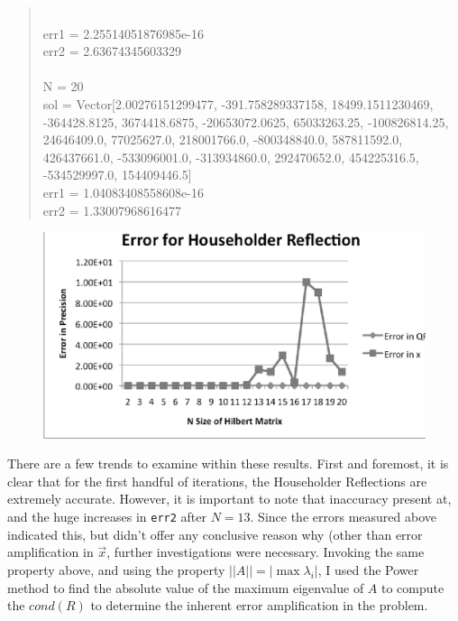\documentclass[letterpaper,12pt]{article}
\begin{document}
\begin{quote}
\\err1 = 2.25514051876985e-16
\\err2 = 2.63674345603329
\\
\\N = 20
\\sol = Vector[2.00276151299477, -391.758289337158, 18499.1511230469, -364428.8125, 3674418.6875, -20653072.0625, 65033263.25, -100826814.25, 24646409.0, 77025627.0, 218001766.0, -800348840.0, 587811592.0, 426437661.0, -533096001.0, -313934860.0, 292470652.0, 454225316.5, -534529997.0, 154409446.5]
\\err1 = 1.04083408558608e-16
\\err2 = 1.33007968616477
\end{quote}

\begin{figure}[ht] 
  {\includegraphics{householder.eps}} %
\end{figure} 


There are a few trends to examine within these results.
First and foremost, it is clear that for the first handful of iterations, the
Householder Reflections are extremely accurate.
However, it is important to note that inaccuracy present at, and the huge
increases in \texttt{err2} after $N =13$.
Since the errors measured above indicated this, but didn't offer any conclusive
reason why (other than error amplification in $\vec{x}$, further investigations
were necessary.
Invoking the same property above, and using the property $||A|| = |\max{\lambda_i}|$,
I used the Power method to find the absolute value of the maximum eigenvalue of
$A$ to compute the $cond(R)$ to determine the inherent error amplification in the
problem.
\end{document}
